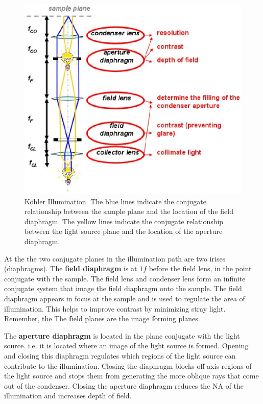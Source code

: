 \documentclass[a4paper]{report}
\begin{document}
\begin{figure}[ht]
\center
\includegraphics[width=5in]{koehler.eps}
\caption{K\"{o}hler Illumination. 
The blue lines indicate the conjugate relationship between the sample plane and the location of the field diaphragm.
The yellow lines indicate the conjugate relationship between the light source plane and the location of the aperture diaphragm.
}
\label{fig:koehler}
\end{figure}

At the the two conjugate planes in the illumination path are two irises (diaphragms). 
The \textbf{field diaphragm} is at $1f$ before the field lens, in the point conjugate with the sample. 
The field lens and condenser lens form an infinite conjugate system that image the field diaphragm onto the sample. 
The field diaphragm appears in focus at the sample and is used to regulate the area of illumination. 
This helps to improve contrast by minimizing stray light. 
Remember, the The \textbf{f}ield planes are the image \textbf{f}orming planes. 

The \textbf{aperture diaphragm} is located in the plane conjugate with the light source. 
i.e. it is located where an image of the light source is formed. 
Opening and closing this diaphragm regulates which regions of the light source can contribute to the illumination. 
Closing the diaphragm blocks off-axis regions of the light source and stops them from generating the more oblique rays that come out of the condenser. 
Closing the aperture diaphragm reduces the NA of the illumination and increases depth of field. 
\end{document}
